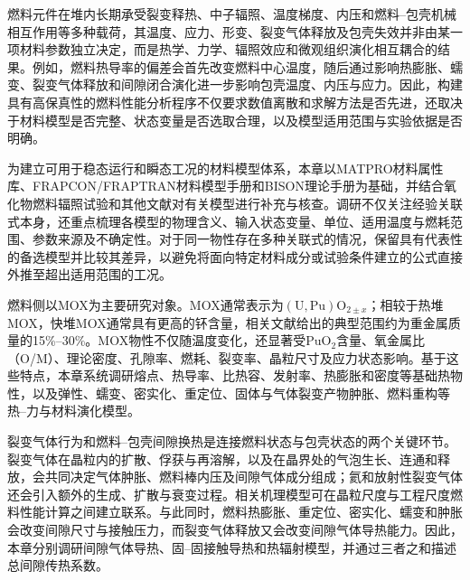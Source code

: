 


\setcounter{topnumber}{3}
\setcounter{bottomnumber}{2}
\setcounter{totalnumber}{5}
\renewcommand{\topfraction}{0.90}
\renewcommand{\bottomfraction}{0.80}
\renewcommand{\textfraction}{0.08}
\renewcommand{\floatpagefraction}{0.85}

燃料元件在堆内长期承受裂变释热、中子辐照、温度梯度、内压和燃料--包壳机械相互作用等多种载荷，其温度、应力、形变、裂变气体释放及包壳失效并非由某一项材料参数独立决定，而是热学、力学、辐照效应和微观组织演化相互耦合的结果\cite{vanuffelenReviewFuelPerformance2019}。例如，燃料热导率的偏差会首先改变燃料中心温度，随后通过影响热膨胀、蠕变、裂变气体释放和间隙闭合演化进一步影响包壳温度、内压与应力。因此，构建具有高保真性的燃料性能分析程序不仅要求数值离散和求解方法是否先进，还取决于材料模型是否完整、状态变量是否选取合理，以及模型适用范围与实验依据是否明确。

为建立可用于稳态运行和瞬态工况的材料模型体系，本章以MATPRO材料属性库、FRAPCON/FRAPTRAN材料模型手册和BISON理论手册为基础\cite{hagrmanSCDAPRELAP5MOD1995,luscherMaterialPropertyCorrelations2010,halesBISONTheoryManual2016}，并结合氧化物燃料辐照试验和其他文献对有关模型进行补充与核查。调研不仅关注经验关联式本身，还重点梳理各模型的物理含义、输入状态变量、单位、适用温度与燃耗范围、参数来源及不确定性。对于同一物性存在多种关联式的情况，保留具有代表性的备选模型并比较其差异，以避免将面向特定材料成分或试验条件建立的公式直接外推至超出适用范围的工况。

燃料侧以MOX为主要研究对象。MOX通常表示为$(\mathrm{U},\mathrm{Pu})\mathrm{O}_{2\pm x}$；相较于热堆MOX，快堆MOX通常具有更高的钚含量，相关文献给出的典型范围约为重金属质量的15\%--30\%\cite{crawfordFuelsSodiumcooledFast2007,inoueThermalConductivityUranium2000}。MOX物性不仅随温度变化，还显著受$\mathrm{PuO}_2$含量、氧金属比（O/M）、理论密度、孔隙率、燃耗、裂变率、晶粒尺寸及应力状态影响。基于这些特点，本章系统调研熔点、热导率、比热容、发射率、热膨胀和密度等基础热物性，以及弹性、蠕变、密实化、重定位、固体与气体裂变产物肿胀、燃料重构等热--力与材料演化模型。

裂变气体行为和燃料--包壳间隙换热是连接燃料状态与包壳状态的两个关键环节。裂变气体在晶粒内的扩散、俘获与再溶解，以及在晶界处的气泡生长、连通和释放，会共同决定气体肿胀、燃料棒内压及间隙气体成分组成；氦和放射性裂变气体还会引入额外的生成、扩散与衰变过程。相关机理模型可在晶粒尺度与工程尺度燃料性能计算之间建立联系\cite{pizzocriSCIANTIXNewOpen2020}。与此同时，燃料热膨胀、重定位、密实化、蠕变和肿胀会改变间隙尺寸与接触压力，而裂变气体释放又会改变间隙气体导热能力。因此，本章分别调研间隙气体导热、固--固接触导热和热辐射模型，并通过三者之和描述总间隙传热系数。

